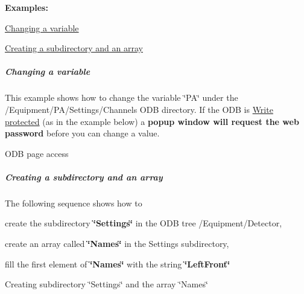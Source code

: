 {\bfseries Examples:} 


\begin{DoxyItemize}
\item \hyperlink{RC_mhttpd_ODB_page_RC_mhttpd_ODB_page_example1}{Changing a variable}
\item \hyperlink{RC_mhttpd_ODB_page_RC_mhttpd_ODB_page_example2}{Creating a subdirectory and an array}
\end{DoxyItemize}\hypertarget{RC_mhttpd_ODB_page_RC_mhttpd_ODB_page_example1}{}\subparagraph{Changing a variable}\label{RC_mhttpd_ODB_page_RC_mhttpd_ODB_page_example1}
This example shows how to change the variable \char`\"{}PA\char`\"{} under the /Equipment/PA/Settings/Channels ODB directory. If the ODB is \hyperlink{RC_customize_ODB_RC_Access_Control}{Write protected} (as in the example below) a {\bfseries  popup window will request the web password } before you can change a value.

\par
\par
\par
 \begin{center}  ODB page access  \par
\par
\par
  \end{center}  \par
\par
\par
 \par
\hypertarget{RC_mhttpd_ODB_page_RC_mhttpd_ODB_page_example2}{}\subparagraph{Creating a subdirectory and an array}\label{RC_mhttpd_ODB_page_RC_mhttpd_ODB_page_example2}
The following sequence shows how to
\begin{DoxyItemize}
\item create the subdirectory {\bfseries \char`\"{}Settings\char`\"{}} in the ODB tree /Equipment/Detector,
\item create an array called {\bfseries \char`\"{}Names\char`\"{}} in the Settings subdirectory,
\item fill the first element of {\bfseries \char`\"{}Names\char`\"{}} with the string {\bfseries \char`\"{}LeftFront\char`\"{}} 
\end{DoxyItemize}

\par
\par
\par
 \begin{center}  Creating subdirectory \char`\"{}Settings\char`\"{} and the array \char`\"{}Names\char`\"{} \par
\par
\par
  \end{center}  \par
\par
\par




